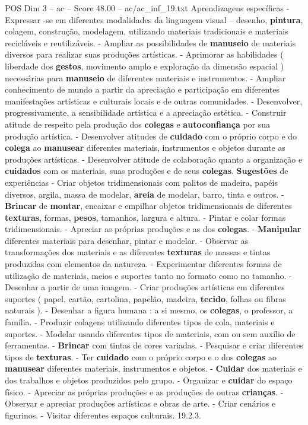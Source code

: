 \begin{textsample}{POS Dim 3 – ac – Score 48.00 – ac/ac\_inf\_19.txt}
Aprendizagens específicas - Expressar -se em diferentes modalidades da linguagem visual – desenho, \textbf{pintura}, colagem, construção, modelagem, utilizando materiais tradicionais e materiais recicláveis e reutilizáveis. - Ampliar as possibilidades de \textbf{manuseio} de materiais diversos para realizar suas produções artísticas. - Aprimorar as habilidades ( liberdade dos \textbf{gestos}, movimento amplo e exploração da dimensão espacial ) necessárias para \textbf{manuseio} de diferentes materiais e instrumentos. - Ampliar conhecimento de mundo a partir da apreciação e participação em diferentes manifestações artísticas e culturais locais e de outras comunidades. - Desenvolver, progressivamente, a sensibilidade artística e a apreciação estética. - Construir atitude de respeito pela produção dos \textbf{colegas} e \textbf{autoconfiança} por sua produção artística. - Desenvolver atitudes de \textbf{cuidado} com o próprio corpo e do \textbf{colega} ao \textbf{manusear} diferentes materiais, instrumentos e objetos durante as produções artísticas. - Desenvolver atitude de colaboração quanto a organização e \textbf{cuidados} com os materiais, suas produções e de seus \textbf{colegas}. \textbf{Sugestões} de experiências - Criar objetos tridimensionais com palitos de madeira, papéis diversos, argila, massa de modelar, \textbf{areia} de modelar, barro, tinta e outros. - \textbf{Brincar} de \textbf{montar}, encaixar e empilhar objetos tridimensionais de diferentes \textbf{texturas}, formas, \textbf{pesos}, tamanhos, largura e altura. - Pintar e colar formas tridimensionais. - Apreciar as próprias produções e as dos \textbf{colegas}. - \textbf{Manipular} diferentes materiais para desenhar, pintar e modelar. - Observar as transformações dos materiais e as diferentes \textbf{texturas} de massas e tintas produzidas com elementos da natureza. - Experimentar diferentes formas de utilização de materiais, meios e suportes tanto no formato como no tamanho. - Desenhar a partir de uma imagem. - Criar produções artísticas em diferentes suportes ( papel, cartão, cartolina, papelão, madeira, \textbf{tecido}, folhas ou fibras naturais ). - Desenhar a figura humana : a si mesmo, os \textbf{colegas}, o professor, a família. - Produzir colagens utilizando diferentes tipos de cola, materiais e suportes. - Modelar usando diferentes tipos de materiais, com ou sem auxílio de ferramentas. - \textbf{Brincar} com tintas de cores variadas. - Pesquisar e criar diferentes tipos de \textbf{texturas}. - Ter \textbf{cuidado} com o próprio corpo e o dos \textbf{colegas} ao \textbf{manusear} diferentes materiais, instrumentos e objetos. - \textbf{Cuidar} dos materiais e dos trabalhos e objetos produzidos pelo grupo. - Organizar e \textbf{cuidar} do espaço físico. - Apreciar as próprias produções e as produções de outras \textbf{crianças}. - Observar e apreciar produções artísticas e obras de arte. - Criar cenários e figurinos. - Visitar diferentes espaços culturais. 19.2.3.

\end{textsample}
